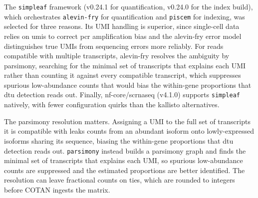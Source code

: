 \begin{table}[htbp]
    \centering
    \caption{Comparison of scRNA-seq pseudo-alignment architectures.}\label{tab:pseudoalign-tools}
    \vspace{0.5em}
    \small
    \setlength{\tabcolsep}{6pt}
\end{table}

The \texttt{simpleaf} framework\cite{he2023simpleaf} (v0.24.1 for quantification, v0.24.0 for the index build), which orchestrates \texttt{alevin-fry} for quantification and \texttt{piscem} for indexing, was selected for three reasons. Its UMI handling is superior, since single-cell data relies on \glspl{umi} to correct \gls{pcr} amplification bias and the alevin-fry error model distinguishes true UMIs from sequencing errors more reliably. For reads compatible with multiple transcripts, alevin-fry resolves the ambiguity by parsimony, searching for the minimal set of transcripts that explains each UMI rather than counting it against every compatible transcript, which suppresses spurious low-abundance counts that would bias the within-gene proportions that \gls{dtu} detection reads out. Finally, nf-core/scrnaseq (v4.1.0) supports \texttt{simpleaf} natively, with fewer configuration quirks than the kallisto alternatives.

The parsimony resolution matters. Assigning a UMI to the full set of transcripts it is compatible with leaks counts from an abundant isoform onto lowly-expressed isoforms sharing its sequence, biasing the within-gene proportions that \gls{dtu} detection reads out. \texttt{parsimony} instead builds a parsimony graph and finds the minimal set of transcripts that explains each UMI, so spurious low-abundance counts are suppressed and the estimated proportions are better identified. The resolution can leave fractional counts on ties, which are rounded to integers before COTAN ingests the matrix.


